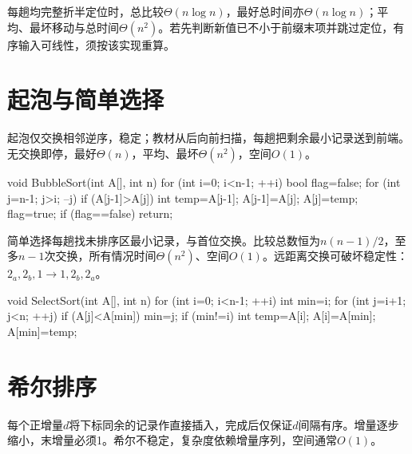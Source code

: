 每趟均完整折半定位时，总比较\(\Theta(n\log n)\)，最好总时间亦\(\Theta(n\log n)\)；平均、最坏移动与总时间\(\Theta(n^2)\)。若先判断新值已不小于前缀末项并跳过定位，有序输入可线性，须按该实现重算。

\section{起泡与简单选择}\label{DS08-exchange-selection}

起泡仅交换相邻逆序，稳定；教材从后向前扫描，每趟把剩余最小记录送到前端。无交换即停，最好\(\Theta(n)\)，平均、最坏\(\Theta(n^2)\)，空间\(O(1)\)。

\par\smallskip\noindent\begin{minipage}{\linewidth}
\begin{codeblock}[language={C++}]
void BubbleSort(int A[], int n) {
    for (int i=0; i<n-1; ++i) {
        bool flag=false;
        for (int j=n-1; j>i; --j)
            if (A[j-1]>A[j]) {
                int temp=A[j-1];
                A[j-1]=A[j]; A[j]=temp;
                flag=true;
            }
        if (flag==false) return;
    }
}
\end{codeblock}
\end{minipage}\par\smallskip

简单选择每趟找未排序区最小记录，与首位交换。比较总数恒为\(n(n-1)/2\)，至多\(n-1\)次交换，所有情况时间\(\Theta(n^2)\)、空间\(O(1)\)。远距离交换可破坏稳定性：\(2_a,2_b,1\to1,2_b,2_a\)。

\par\smallskip\noindent\begin{minipage}{\linewidth}
\begin{codeblock}[language={C++}]
void SelectSort(int A[], int n) {
    for (int i=0; i<n-1; ++i) {
        int min=i;
        for (int j=i+1; j<n; ++j)
            if (A[j]<A[min]) min=j;
        if (min!=i) {
            int temp=A[i]; A[i]=A[min]; A[min]=temp;
        }
    }
}
\end{codeblock}
\end{minipage}\par\smallskip

\section{希尔排序}\label{DS08-shell}

每个正增量\(d\)将下标同余的记录作直接插入，完成后仅保证\(d\)间隔有序。增量逐步缩小，末增量必须1。希尔不稳定，复杂度依赖增量序列，空间通常\(O(1)\)。

